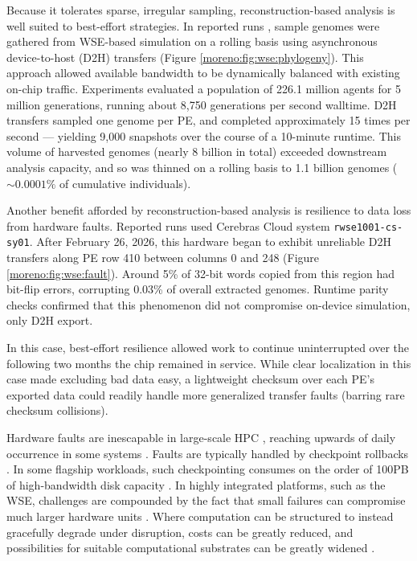 Because it tolerates sparse, irregular sampling, reconstruction-based analysis is well suited to best-effort strategies.
In reported runs \cite{singhvi2025scalable}, sample genomes were gathered from WSE-based simulation on a rolling basis using asynchronous device-to-host (D2H) transfers (Figure \ref{moreno:fig:wse:phylogeny}).
This approach allowed available bandwidth to be dynamically balanced with existing on-chip traffic.
Experiments evaluated a population of 226.1 million agents for 5 million generations, running about 8{\small,}750 generations per second walltime.
D2H transfers sampled one genome per PE, and completed approximately 15 times per second --- yielding 9{\small,}000 snapshots over the course of a 10-minute runtime.
This volume of harvested genomes (nearly 8 billion in total) exceeded downstream analysis capacity, and so was thinned on a rolling basis to 1.1 billion genomes ($\sim0.0001\%$ of cumulative individuals).

Another benefit afforded by reconstruction-based analysis is resilience to data loss from hardware faults.
Reported runs used Cerebras Cloud system \texttt{rwse1001-\allowbreak cs-\allowbreak sy01}.
After February 26, 2026, this hardware began to exhibit unreliable D2H transfers along PE row 410 between columns 0 and 248 (Figure \ref{moreno:fig:wse:fault}).
Around 5\% of 32-bit words copied from this region had bit-flip errors, corrupting 0.03\% of overall extracted genomes.
Runtime parity checks confirmed that this phenomenon did not compromise on-device simulation, only D2H export.

In this case, best-effort resilience allowed work to continue uninterrupted over the following two months the chip remained in service.
While clear localization in this case made excluding bad data easy, a lightweight checksum over each PE's exported data could readily handle more generalized transfer faults (barring rare checksum collisions).

Hardware faults are inescapable in large-scale HPC \cite{gupta2017failures,navaux2023challenges}, reaching upwards of daily occurrence in some systems \cite{kokolis2025revisiting}.
Faults are typically handled by checkpoint rollbacks \cite{gupta2017failures,zhu2025understanding}.
In some flagship workloads, such checkpointing consumes on the order of 100PB of high-bandwidth disk capacity \cite{frontiere2025cosmological}.
In highly integrated platforms, such as the WSE, challenges are compounded by the fact that small failures can compromise much larger hardware units \cite{cerebras2025yield}.
Where computation can be structured to instead gracefully degrade under disruption, costs can be greatly reduced, and possibilities for suitable computational substrates can be greatly widened \cite{markovi2020physics,ackley2011pursue,dreslinski2010near}.

